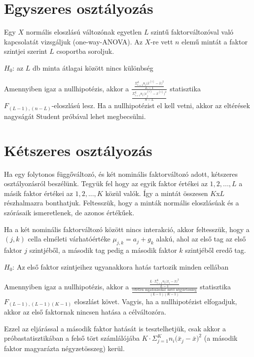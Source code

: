 \section{Egyszeres osztályozás}

Egy $X$ normális eloszlású változónak egyetlen $L$ szintű faktorváltozóval való kapcsolatát vizsgáljuk (one-way-ANOVA). Az $X$-re vett $n$ elemű mintát a faktor szintjei szerint $L$ csoportba soroljuk.

$H_0$: az $L$ db minta átlagai között nincs különbség

Amennyiben igaz a nullhipotézis, akkor a $\frac{\frac{\Sigma^L_{i=1}n_i \big(\bar{x}^{(i)} - \bar{x} \big)^2}{L-1}}{\frac{\Sigma^L_{i=1}n_i \big (x^{(i)}_j - \bar{x}^{(i)} \big)^2}{n-L}}$ statisztika\\ $F_{(L-1),(n-L)}$-eloszlású lesz. Ha a nullhipotézist el kell vetni, akkor az eltérések nagyságát Student próbával lehet megbecsülni.

\section{Kétszeres osztályozás}

Ha egy folytonos függőváltozó, és két nominális faktorváltozó adott, kétszeres osztályozásról beszélünk. Tegyük fel hogy az egyik faktor értékei az $1, 2, ..., L$ a másik faktor értékei az $1, 2, ..., K$ közül valók. Így a mintát összesen $K$x$L$ részhalmazra bonthatjuk. Feltesszük, hogy a minták normális eloszlásúak és a szórásaik ismeretlenek, de azonos értékűek.

Ha a két nominális faktorváltozó között nincs interakció, akkor feltesszük, hogy a $(j,k)$ cella elméleti várhatóértéke $\mu_{j,k} = a_j+g_k$ alakú, ahol az első tag az első faktor $j$ szintjéből, a második tag pedig a második faktor $k$ szintjéből eredő tag.

$H_0$: Az első faktor szintjeihez ugyanakkora hatás tartozik minden cellában

Amennyiben igaz a nullhipotézis, akkor a
$\frac{\frac{L \cdot \Sigma^L_{i=1}n_i \big(\bar{x}_i - \bar{x} \big)^2}{L-1}}{\frac{\text{véletlen ingadozásokat mérő négyzetösszeg}}{(L-1)(K-1)}}$
statisztika\\ $F_{(L-1),(L-1)(K-1)}$ eloszlást követ. Vagyis, ha a nullhipotézist elfogadjuk, akkor az első faktornak nincsen hatása a célváltozóra.

Ezzel az eljárással a második faktor hatását is tesztelhetjük, csak akkor a próbastatisztikában a felső tört számlálójába $K \cdot \Sigma^K_{j=1}n_i \big(\bar{x}_j - \bar{x} \big)^2$ (a második faktor magyarázta négyzetösszeg) kerül.

